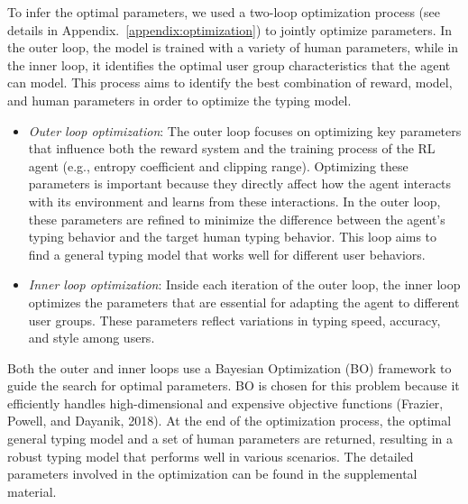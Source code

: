 To infer the optimal parameters, we used a two-loop optimization process (see details in Appendix.~\ref{appendix:optimization}) to jointly optimize parameters. In the outer loop, the model is trained with a variety of human parameters, while in the inner loop, it identifies the optimal user group characteristics that the agent can model. This process aims to identify the best combination of reward, model, and human parameters in order to optimize the typing model.

\begin{itemize}
    \item \textit{Outer loop optimization}: The outer loop focuses on optimizing key parameters that influence both the reward system and the training process of the RL agent (e.g., entropy coefficient and clipping range). Optimizing these parameters is important because they directly affect how the agent interacts with its environment and learns from these interactions. In the outer loop, these parameters are refined to minimize the difference between the agent's typing behavior and the target human typing behavior. This loop aims to find a general typing model that works well for different user behaviors.
    \item \textit{Inner loop optimization}:  Inside each iteration of the outer loop, the inner loop optimizes the parameters that are essential for adapting the agent to different user groups. These parameters reflect variations in typing speed, accuracy, and style among users.
\end{itemize}

Both the outer and inner loops use a Bayesian Optimization (BO) framework to guide the search for optimal parameters. BO is chosen for this problem because it efficiently handles high-dimensional and expensive objective functions (Frazier, Powell, and Dayanik, 2018).  At the end of the optimization process, the optimal general typing model and a set of human parameters are returned, resulting in a robust typing model that performs well in various scenarios. The detailed parameters involved in the optimization can be found in the supplemental material.



